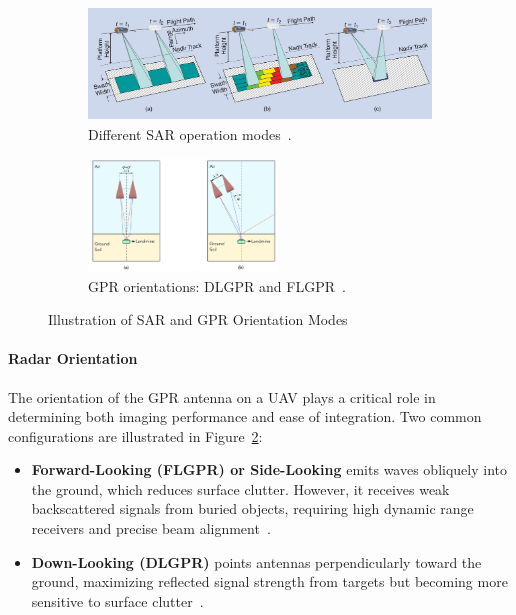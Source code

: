 \begin{figure}[h!]
    \centering
    \begin{subfigure}[b]{0.48\linewidth}
        \centering
        \includegraphics[height=3cm]{figs/Huirui/sar_modes.png}
        \caption{Different SAR operation modes~\cite{moreira2013tutorial}.}
        \label{fig:sar_modes}
    \end{subfigure}
    \hfill
    \begin{subfigure}[b]{0.48\linewidth}
        \centering
        \includegraphics[height=3cm]{figs/Huirui/gpr_ori_modes.png}
        \caption{GPR orientations: DLGPR and FLGPR~\cite{vsipovs2020lightweight}.}
        \label{fig:GPR_Ori_modes}
    \end{subfigure}
    \caption{Illustration of SAR and GPR Orientation Modes}
    \label{fig:sar_gpr_modes}
\end{figure}

\paragraph{Radar Orientation}

The orientation of the GPR antenna on a UAV plays a critical role in determining both imaging performance and ease of integration. Two common configurations are illustrated in Figure~\ref{fig:GPR_Ori_modes}:

\begin{itemize}
    \item \textbf{Forward-Looking (FLGPR) or Side-Looking} emits waves obliquely into the ground, which reduces surface clutter. However, it receives weak backscattered signals from buried objects, requiring high dynamic range receivers and precise beam alignment~\cite{garcia2020airborne}.

    \item \textbf{Down-Looking (DLGPR)} points antennas perpendicularly toward the ground, maximizing reflected signal strength from targets but becoming more sensitive to surface clutter~\cite{garcia2020airborne}.
\end{itemize}


